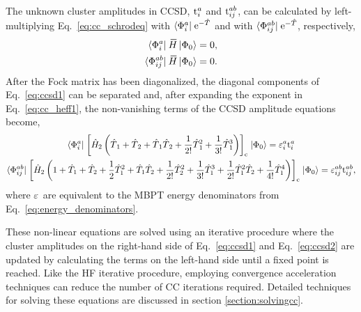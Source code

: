\documentclass[thesis.tex]{subfiles}
\begin{document}
The unknown cluster amplitudes in CCSD, $\text{t}^{a}_{i}$ and $\text{t}^{ab}_{ij}$, can be calculated by left-multiplying Eq.\ \eqref{eq:cc_schrodeq} with $\langle \Phi^{a}_{i} |\hspace{1pt} \operatorname{e}^{-\hat{T}\hspace{-0.25pt}}$ and with $\langle \Phi^{ab}_{ij} |\hspace{1pt} \operatorname{e}^{-\hat{T}\hspace{-0.25pt}}$, respectively,
\begin{align} \label{eq:ccsd1}
  \statebra{a}{i} \EHam \refket &= 0, \notag \\
  \statebra{ab}{ij} \EHam \refket &= 0.
\end{align}
After the Fock matrix has been diagonalized, the diagonal components of Eq.\ \eqref{eq:ccsd1} can be separated and, after expanding the exponent in Eq.\ \eqref{eq:cc_heff1}, the non-vanishing terms of the CCSD amplitude equations become,
\begin{gather} \label{eq:ccsd2}
  \langle \Phi^{a}_{i} |\hspace{1pt} \left[ \hat{H}\hspace{-1pt}_{2} \left(\hat{T}\hspace{-0.25pt}_{1} + \hat{T}\hspace{-0.25pt}_{2} + \hat{T}\hspace{-0.25pt}_{1}\hat{T}\hspace{-0.25pt}_{2} + \frac{1}{2!} \hat{T}\hspace{-0.25pt}_{1}^{2} + \frac{1}{3!} \hat{T}\hspace{-0.25pt}_{1}^{3}\right) \right]_{\mathrm{c}} \hspace{1pt}\lvert \Phi_{0} \rangle = \varepsilon^{a}_{i}\text{t}^{a}_{i} \\
  \langle \Phi^{ab}_{ij} |\hspace{1pt} \left[ \hat{H}\hspace{-1pt}_{2} \left(1 + \hat{T}_1 + \hat{T}_2 + \frac{1}{2} \hat{T}_1^{2} + \hat{T}_1\hat{T}_2 + \frac{1}{2!} \hat{T}_2^{2} + \frac{1}{3!} \hat{T}_1^{3} + \frac{1}{2!} \hat{T}_1^{2} \hat{T}_2 + \frac{1}{4!} \hat{T}_1^{4}\right) \right]_{\mathrm{c}} \hspace{1pt}\lvert \Phi_{0} \rangle = \varepsilon^{ab}_{ij}\text{t}^{ab}_{ij}, \notag
\end{gather}
where $\varepsilon^{}_{}$ are equivalent to the MBPT energy denominators from Eq.\ \eqref{eq:energy_denominators}.

These non-linear equations are solved using an iterative procedure where the cluster amplitudes on the right-hand side of Eq.\ \eqref{eq:ccsd1} and Eq.\ \eqref{eq:ccsd2} are updated by calculating the terms on the left-hand side until a fixed point is reached.  Like the HF iterative procedure, employing convergence acceleration techniques can reduce the number of CC iterations required.  Detailed techniques for solving these equations are discussed in section \ref{section:solvingcc}.
\end{document}
